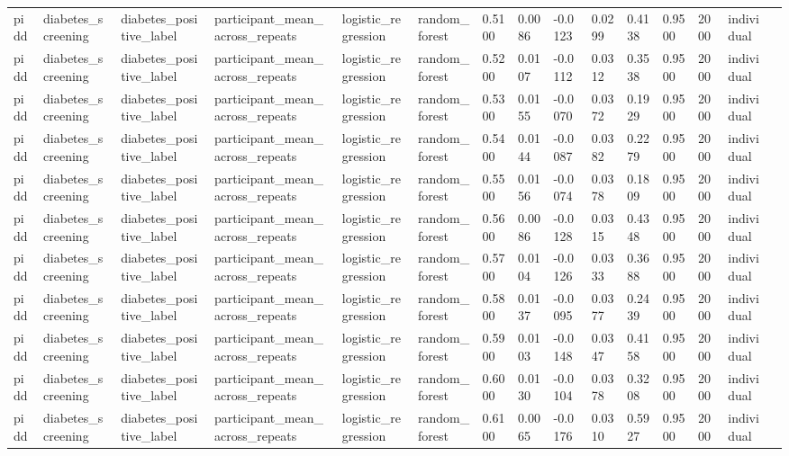 \begin{tabular}{lllllllllllllll}
pidd & diabetes\_screening & diabetes\_positive\_label & participant\_mean\_across\_repeats & logistic\_regression & random\_forest & 0.5100 & 0.0086 & -0.0123 & 0.0299 & 0.4138 & 0.9500 & 2000 & individual &  \\
pidd & diabetes\_screening & diabetes\_positive\_label & participant\_mean\_across\_repeats & logistic\_regression & random\_forest & 0.5200 & 0.0107 & -0.0112 & 0.0312 & 0.3538 & 0.9500 & 2000 & individual &  \\
pidd & diabetes\_screening & diabetes\_positive\_label & participant\_mean\_across\_repeats & logistic\_regression & random\_forest & 0.5300 & 0.0155 & -0.0070 & 0.0372 & 0.1929 & 0.9500 & 2000 & individual &  \\
pidd & diabetes\_screening & diabetes\_positive\_label & participant\_mean\_across\_repeats & logistic\_regression & random\_forest & 0.5400 & 0.0144 & -0.0087 & 0.0382 & 0.2279 & 0.9500 & 2000 & individual &  \\
pidd & diabetes\_screening & diabetes\_positive\_label & participant\_mean\_across\_repeats & logistic\_regression & random\_forest & 0.5500 & 0.0156 & -0.0074 & 0.0378 & 0.1809 & 0.9500 & 2000 & individual &  \\
pidd & diabetes\_screening & diabetes\_positive\_label & participant\_mean\_across\_repeats & logistic\_regression & random\_forest & 0.5600 & 0.0086 & -0.0128 & 0.0315 & 0.4348 & 0.9500 & 2000 & individual &  \\
pidd & diabetes\_screening & diabetes\_positive\_label & participant\_mean\_across\_repeats & logistic\_regression & random\_forest & 0.5700 & 0.0104 & -0.0126 & 0.0333 & 0.3688 & 0.9500 & 2000 & individual &  \\
pidd & diabetes\_screening & diabetes\_positive\_label & participant\_mean\_across\_repeats & logistic\_regression & random\_forest & 0.5800 & 0.0137 & -0.0095 & 0.0377 & 0.2439 & 0.9500 & 2000 & individual &  \\
pidd & diabetes\_screening & diabetes\_positive\_label & participant\_mean\_across\_repeats & logistic\_regression & random\_forest & 0.5900 & 0.0103 & -0.0148 & 0.0347 & 0.4158 & 0.9500 & 2000 & individual &  \\
pidd & diabetes\_screening & diabetes\_positive\_label & participant\_mean\_across\_repeats & logistic\_regression & random\_forest & 0.6000 & 0.0130 & -0.0104 & 0.0378 & 0.3208 & 0.9500 & 2000 & individual &  \\
pidd & diabetes\_screening & diabetes\_positive\_label & participant\_mean\_across\_repeats & logistic\_regression & random\_forest & 0.6100 & 0.0065 & -0.0176 & 0.0310 & 0.5927 & 0.9500 & 2000 & individual &  \\

\end{tabular}
